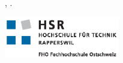 
\begin{titlepage}
\begin{center}
\large

\hfill
\vfill

\begingroup
\color{OsmGreen}{\LARGE{\myTitle}}\\ \bigskip %
\endgroup

{\myName} %

\vfill


\mySubtitle \\ %
\myThesis, \myTime. \\

\vspace{2cm}

\includegraphics[width=5cm]{images/HSR_Logo_CMYK} \medskip


\end{center}
\end{titlepage}
